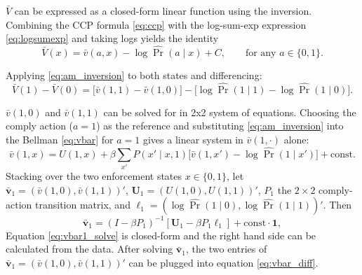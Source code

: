 \documentclass{article}
\begin{document}
$\bar V$ can be expressed as a closed-form linear function using the \cite{arcidiaconomiller2011} inversion. Combining the CCP formula \eqref{eq:ccp} with the log-sum-exp expression
\eqref{eq:logsumexp} and taking logs yields the identity
\begin{equation}
\bar V(x) = \bar v(a, x) - \log \hat\Pr(a \mid x) + C,
\qquad \text{for any } a \in \{0, 1\}.
\label{eq:am_inversion}
\end{equation}

Applying
\eqref{eq:am_inversion} to both states and differencing:
\begin{equation}
\bar V(1) - \bar V(0) = \big[\bar v(1, 1) - \bar v(1, 0)\big]
- \big[\log \hat\Pr(1 \mid 1) - \log \hat\Pr(1 \mid 0)\big].
\label{eq:vbar_diff}
\end{equation}

$\bar v(1, 0)$ and $\bar v(1, 1)$ can be solved for in 2x2 system of equations. Choosing the comply action ($a = 1$) as the reference and substituting \eqref{eq:am_inversion} into the Bellman \eqref{eq:vbar} for $a = 1$ gives a linear system in $\bar v(1, \cdot)$ alone:
\begin{equation}
\bar v(1, x) = U(1, x) + \beta \sum_{x'} P(x' \mid x, 1)
\big[ \bar v(1, x') - \log \hat\Pr(1 \mid x') \big]
+ \text{const}.
\label{eq:vbar1_system}
\end{equation}
Stacking over the two enforcement states $x \in \{0, 1\}$, let $\boldsymbol{\bar v}_1 = (\bar v(1, 0), \bar v(1, 1))'$, $\boldsymbol{U}_1 = (U(1, 0), U(1, 1))'$, $P_1$ the $2 \times 2$ comply-action transition matrix, and $\boldsymbol{\ell}_1 = (\log \hat\Pr(1 \mid 0), \log \hat\Pr(1 \mid 1))'$. Then
\begin{equation}
\boldsymbol{\bar v}_1 = (I - \beta P_1)^{-1}
\left[ \boldsymbol{U}_1 - \beta P_1 \boldsymbol{\ell}_1 \right]
+ \text{const} \cdot \mathbf{1},
\label{eq:vbar1_solve}
\end{equation}
Equation \ref{eq:vbar1_solve} is closed-form and the right hand side can be calculated from the data. After solving $\boldsymbol{\bar v}_1$, the two entries of $\boldsymbol{\bar v}_1 = (\bar v(1, 0), \bar v(1, 1))'$ can be plugged into equation \ref{eq:vbar_diff}.
\end{document}

